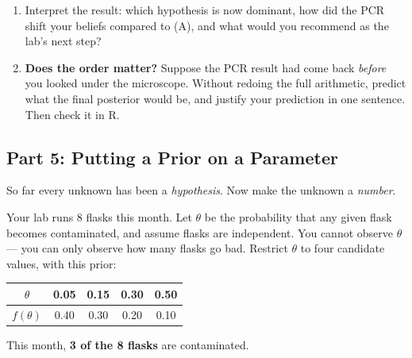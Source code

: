 \documentclass{article}
\begin{document}
\begin{enumerate}[label={\bfseries (\Alph*)},itemsep=.6em]
	\item Interpret the result: which hypothesis is now dominant, how did the PCR shift your beliefs compared to (A), and what would you recommend as the lab's next step? \\[5em]

	\item \textbf{Does the order matter?} Suppose the PCR result had come back \emph{before} you looked under the microscope. Without redoing the full arithmetic, predict what the final posterior would be, and justify your prediction in one sentence. Then check it in R. \\[5em]

\end{enumerate}

\newpage

\subsection*{Part 5: Putting a Prior on a Parameter}

So far every unknown has been a \emph{hypothesis}. Now make the unknown a \emph{number}.

\medskip
Your lab runs 8 flasks this month. Let $\theta$ be the probability that any given flask becomes contaminated, and assume flasks are independent. You cannot observe $\theta$ --- you can only observe how many flasks go bad. Restrict $\theta$ to four candidate values, with this prior:

\begin{center}
\renewcommand{\arraystretch}{1.2}
\begin{tabular}{c|cccc}
\toprule
$\theta$ & 0.05 & 0.15 & 0.30 & 0.50 \\
\midrule
$f(\theta)$ & 0.40 & 0.30 & 0.20 & 0.10 \\
\bottomrule
\end{tabular}
\end{center}

\medskip
This month, \textbf{3 of the 8 flasks} are contaminated.
\end{document}
